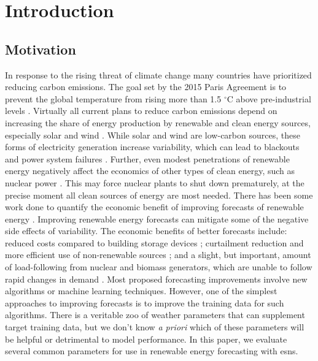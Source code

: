 \section{Introduction}
\subsection{Motivation}
In response to the rising threat of climate change many countries have prioritized reducing carbon emissions. The goal set by the 2015 Paris
Agreement is to prevent the global temperature from rising more than 1.5
$^\circ$C above pre-industrial levels \cite{noauthor_paris_nodate}. Virtually
all current plans to reduce carbon emissions depend on increasing the share of
energy production by renewable and clean energy sources, especially solar and
wind \cite{cany_nuclear_2018, chilvers_realising_2017,99th_general_assembly_illinois_2016,isee_illinois_2015}.
 While solar and wind are low-carbon sources, these
forms of electricity generation increase variability, which can lead to
blackouts and power system failures
\cite{haes_alhelou_survey_2019}. Further, even modest penetrations of renewable
energy negatively affect the economics of other types of clean energy, such as
nuclear power
\cite{cany_nuclear_2018,keppler_carbon_2011,illinois_commerce_commision_icc_potential_2015}. This may force nuclear plants to shut down prematurely, at the
precise moment all clean sources of energy are most needed. There has been
some work done to quantify the economic benefit of improving forecasts of
renewable energy \cite{wang_quantifying_2016, mc_garrigle_quantifying_2015, brancucci_martinez-anido_value_2016}. Improving renewable energy forecasts can
mitigate some of the negative side effects of variability. The economic
benefits of better  forecasts include: reduced costs compared to building
storage devices \cite{wang_quantifying_2016}; curtailment reduction and more
efficient use of non-renewable sources \cite{mc_garrigle_quantifying_2015}; and
a slight, but important, amount of load-following from nuclear and biomass
generators, which are unable to follow rapid changes in demand
\cite{brancucci_martinez-anido_value_2016}. Most proposed forecasting
improvements involve new algorithms or machine learning techniques. However,
one of the simplest approaches to improving forecasts is to improve the
training data for such algorithms. There is a veritable zoo of weather
parameters that can supplement target training data, but we don't know \textit{a
priori} which of these parameters will be helpful or detrimental to model
performance. In this paper, we evaluate several common parameters for use
in renewable energy forecasting with \glspl{esn}.
